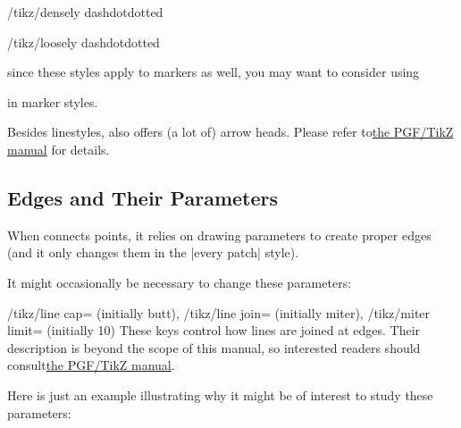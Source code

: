 \begin{stylekey}{/tikz/densely dashdotdotted}
\end{stylekey}

\begin{stylekey}{/tikz/loosely dashdotdotted}
\end{stylekey}
%
\noindent since these styles apply to markers as well, you may want to consider
using
%
\begin{codeexample}
\end{codeexample}
%
\noindent in marker styles.

Besides linestyles, \PGF{} also offers (a lot of) arrow heads. Please refer
to\href{https://tikz.dev/}{the PGF/TikZ manual} for details.
%
\endgroup


\subsection{Edges and Their Parameters}

When \PGFPlots{} connects points, it relies on \PGF{} drawing parameters to
create proper edges (and it only changes them in the |every patch| style).

It might occasionally be necessary to change these parameters:

\begin{keylist}{
    /tikz/line cap= (initially butt),
    /tikz/line join= (initially miter),
    /tikz/miter limit= (initially 10)%
}
    These keys control how lines are joined at edges. Their description is
    beyond the scope of this manual, so interested readers should
    consult\href{https://tikz.dev/}{the PGF/TikZ manual}.

    Here is just an example illustrating why it might be of interest to study
    these parameters:
\begin{codeexample}[]
\end{codeexample}
\end{keylist}


